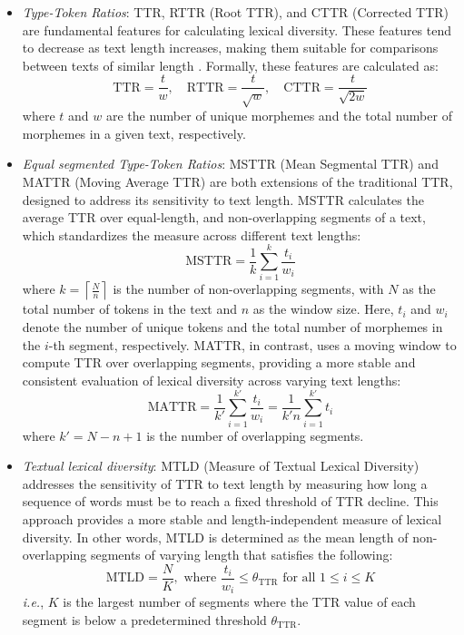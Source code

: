 \begin{itemize}[leftmargin=1.1em]
\item \textsf{\textit{Type-Token Ratios}}: TTR, RTTR (Root TTR), and CTTR (Corrected TTR) are fundamental features for calculating lexical diversity. 
These features tend to decrease as text length increases, making them suitable for comparisons between texts of similar length \cite{joan2013ttr}.
Formally, these features are calculated as:
\begin{equation}
    \text{TTR} = \frac{t}{w}, \quad
    \text{RTTR} = \frac{t}{\sqrt{w}}, \quad
    \text{CTTR} = \frac{t}{\sqrt{2w}}
\end{equation}
where \(t\) and \(w\) are the number of unique morphemes and the total number of morphemes in a given text, respectively. 



\item \textsf{\textit{Equal segmented Type-Token Ratios}}: MSTTR (Mean Segmental TTR) and MATTR (Moving Average TTR) are both extensions of the traditional TTR, designed to address its sensitivity to text length. 
MSTTR calculates the average TTR over equal-length, and non-overlapping segments of a text, which standardizes the measure across different text lengths:
\begin{equation}
    \text{MSTTR} = \frac{1}{k} \sum_{i=1}^{k} \frac{t_i}{w_i} 
\end{equation}
where \(k = \left\lceil \frac{N}{n} \right\rceil\) is the number of non-overlapping segments, with \(N\) as the total number of tokens in the text and \(n\) as the window size. 
Here, \(t_i\) and \(w_i\) denote the number of unique tokens and the total number of morphemes in the \(i\)-th segment, respectively.
MATTR, in contrast, uses a moving window to compute TTR over overlapping segments, providing a more stable and consistent evaluation of lexical diversity across varying text lengths:
\begin{equation}
    \text{MATTR} = \frac{1}{k'} \sum_{i=1}^{k'} \frac{t_i}{w_i} = \frac{1}{k'n} \sum_{i=1}^{k'} t_i
\end{equation}
where \(k' = N-n+1\) is the number of overlapping segments.


\item \textsf{\textit{Textual lexical diversity}}:  
MTLD (Measure of Textual Lexical Diversity) addresses the sensitivity of TTR to text length by measuring how long a sequence of words must be to reach a fixed threshold of TTR decline. 
This approach provides a more stable and length-independent measure of lexical diversity.
In other words, MTLD is determined as the mean length of non-overlapping segments of varying length that satisfies the following:
\begin{equation}
    \text{MTLD} = \frac{N}{K}, \text{ where }\frac{t_i}{w_i} \leq \theta_\textrm{TTR}\text{ for all }1\leq i\leq K 
\end{equation}
\textit{i.e.}, \(K\) is the largest number of segments where the TTR value of each segment is below a predetermined threshold \(\theta_\textrm{TTR}\).


\end{itemize}
